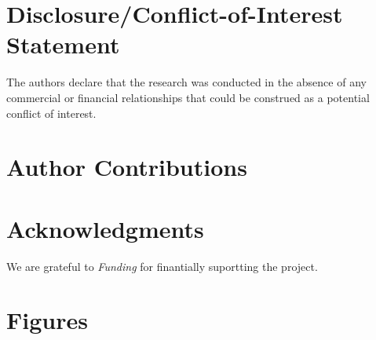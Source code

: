 \documentclass{frontiersSCNS} %
\begin{document}
\section*{Disclosure/Conflict-of-Interest Statement}


The authors declare that the research was conducted in the absence of any commercial or financial relationships that could be construed as a potential conflict of interest.

\section*{Author Contributions}



\section*{Acknowledgments}
 We are grateful to  
\textit{Funding\textcolon} for finantially suportting the project.






\section*{Figures}

\end{document}
